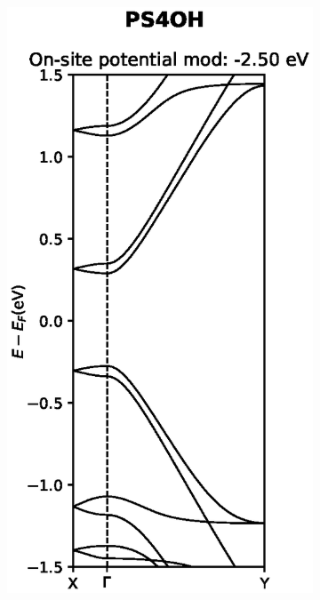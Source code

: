 \begin{figure}[h]
\begin{subfigure}[b]{0.25\textwidth}
    \end{subfigure}
    ~
    \begin{subfigure}[b]{0.25\textwidth}
    \centering
    \includegraphics[width=\textwidth]{Figures/PS4OHmod1.eps}
    \label{PS4OHmod1}
    \end{subfigure}
    ~
    \begin{subfigure}[b]{0.25\textwidth}

\end{subfigure}
\end{figure}
